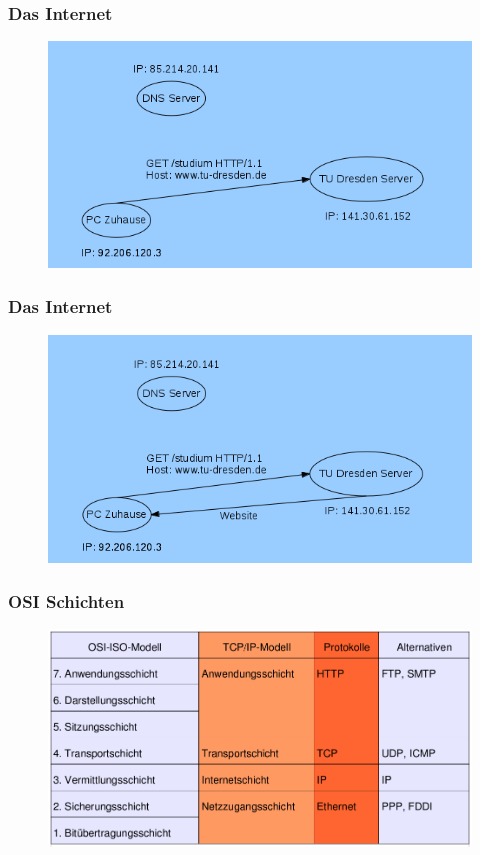 \documentclass[12pt]{beamer}
\begin{document}
\begin{frame}
  \frametitle{Das Internet}
  \begin{figure}
    \includegraphics[height=0.7\textheight]{img/internetstruktur-4.png}
  \end{figure}
\end{frame}

\begin{frame}
  \frametitle{Das Internet}
  \begin{figure}
    \includegraphics[height=0.7\textheight]{img/internetstruktur-5.png}
  \end{figure}
\end{frame}

\begin{frame}
  \frametitle{OSI Schichten}
  \begin{figure}
    \includegraphics[height=0.7\textheight]{img/schichten.png}
  \end{figure}
\end{frame}
\end{document}
